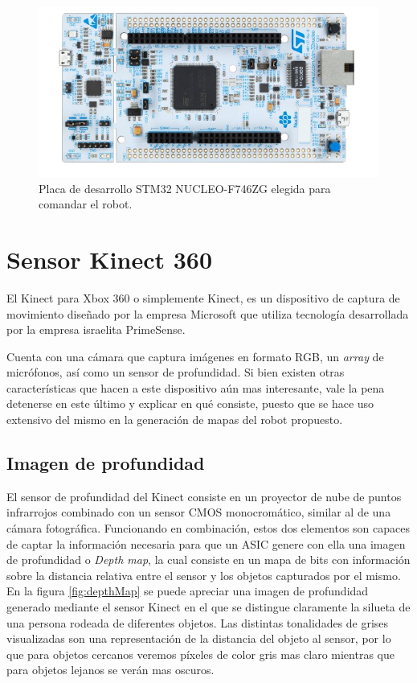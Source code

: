\begin{figure}[ht]
    \centering
    \includegraphics[scale=1.5]{./Figures/stm32nucleo.png}
    \caption{Placa de desarrollo STM32 NUCLEO-F746ZG elegida para comandar el robot.\protect\footnotemark}
    \label{fig:stm32nucleo}
\end{figure}


\section{Sensor Kinect 360}

El Kinect para Xbox 360 o simplemente Kinect, es un dispositivo de captura de movimiento diseñado por la empresa Microsoft que utiliza tecnología desarrollada por la empresa israelita PrimeSense.

Cuenta con una cámara que captura imágenes en formato RGB, un \textit{array} de micrófonos, así como un sensor de profundidad. Si bien existen otras características que hacen a este dispositivo aún mas interesante, vale la pena detenerse en este último y explicar en qué consiste, puesto que se hace uso extensivo del mismo en la generación de mapas del robot propuesto.

\subsection{Imagen de profundidad}

El sensor de profundidad del Kinect consiste en un proyector de nube de puntos infrarrojos combinado con un sensor CMOS monocromático, similar al de una cámara fotográfica. Funcionando en combinación, estos dos elementos son capaces de captar la información necesaria para que un ASIC genere con ella una imagen de profundidad o \textit{Depth map}, la cual consiste en un mapa de bits con información sobre la distancia relativa entre el sensor y los objetos capturados por el mismo. En la figura \ref{fig:depthMap} se puede apreciar una imagen de profundidad generado mediante el sensor Kinect en el que se distingue claramente la silueta de una persona rodeada de diferentes objetos. Las distintas tonalidades de grises visualizadas son una representación de la distancia del objeto al sensor, por lo que para objetos cercanos veremos píxeles de color gris mas claro mientras que para objetos lejanos se verán mas oscuros.

